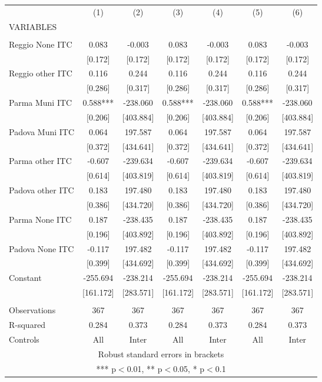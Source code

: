 \begin{tabular}{lcccccc} \hline
 & (1) & (2) & (3) & (4) & (5) & (6) \\
VARIABLES &  &  &  &  &  &  \\ \hline
 &  &  &  &  &  &  \\
Reggio None ITC & 0.083 & -0.003 & 0.083 & -0.003 & 0.083 & -0.003 \\
 & [0.172] & [0.172] & [0.172] & [0.172] & [0.172] & [0.172] \\
Reggio other ITC & 0.116 & 0.244 & 0.116 & 0.244 & 0.116 & 0.244 \\
 & [0.286] & [0.317] & [0.286] & [0.317] & [0.286] & [0.317] \\
Parma Muni ITC & 0.588*** & -238.060 & 0.588*** & -238.060 & 0.588*** & -238.060 \\
 & [0.206] & [403.884] & [0.206] & [403.884] & [0.206] & [403.884] \\
Padova Muni ITC & 0.064 & 197.587 & 0.064 & 197.587 & 0.064 & 197.587 \\
 & [0.372] & [434.641] & [0.372] & [434.641] & [0.372] & [434.641] \\
Parma other ITC & -0.607 & -239.634 & -0.607 & -239.634 & -0.607 & -239.634 \\
 & [0.614] & [403.819] & [0.614] & [403.819] & [0.614] & [403.819] \\
Padova other ITC & 0.183 & 197.480 & 0.183 & 197.480 & 0.183 & 197.480 \\
 & [0.386] & [434.720] & [0.386] & [434.720] & [0.386] & [434.720] \\
Parma None ITC & 0.187 & -238.435 & 0.187 & -238.435 & 0.187 & -238.435 \\
 & [0.196] & [403.892] & [0.196] & [403.892] & [0.196] & [403.892] \\
Padova None ITC & -0.117 & 197.482 & -0.117 & 197.482 & -0.117 & 197.482 \\
 & [0.399] & [434.692] & [0.399] & [434.692] & [0.399] & [434.692] \\
Constant & -255.694 & -238.214 & -255.694 & -238.214 & -255.694 & -238.214 \\
 & [161.172] & [283.571] & [161.172] & [283.571] & [161.172] & [283.571] \\
 &  &  &  &  &  &  \\
Observations & 367 & 367 & 367 & 367 & 367 & 367 \\
R-squared & 0.284 & 0.373 & 0.284 & 0.373 & 0.284 & 0.373 \\
 Controls & All & Inter & All & Inter & All & Inter \\ \hline
\multicolumn{7}{c}{ Robust standard errors in brackets} \\
\multicolumn{7}{c}{ *** p$<$0.01, ** p$<$0.05, * p$<$0.1} \\
\end{tabular}
